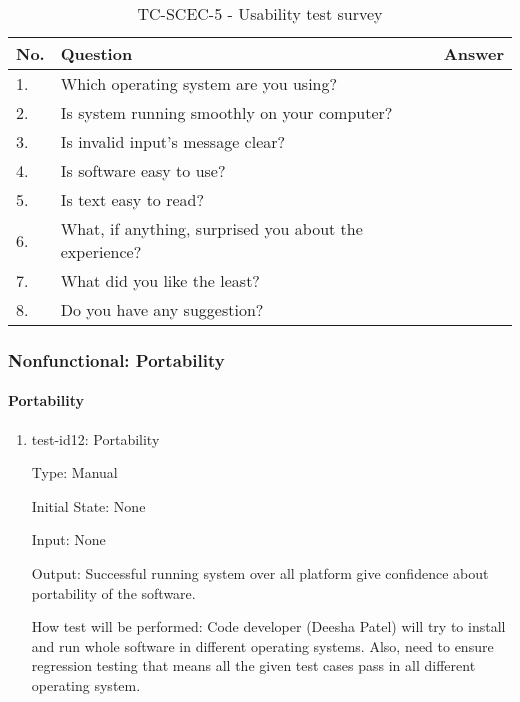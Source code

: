 \documentclass[12pt, titlepage]{article}
\begin{document}
\begin{table}[h!]
\begin{center}
\begin{tabular}{ p{0.5cm}|p{10cm}|c }
\hline
No. &  Question   & Answer \\
\hline
1. & Which operating system are you using?  & \\
2. & Is system running smoothly on your computer?  & \\
3. & Is invalid input's message clear?  &  \\
4. & Is software easy to use? & \\
5. & Is text easy to read? & \\
6. & What, if anything, surprised you about the experience? & \\
7. & What did you like the least? & \\
8. & Do you have any suggestion?  & \\

\hline
\end{tabular}
\caption{TC-SCEC-5 - Usability test survey}
\label{tab:tc-SCEC-5}
\end{center}
\end{table}

\subsubsection{Nonfunctional: Portability}
\label{non_functional_portability}		
\paragraph{Portability}

\begin{enumerate}
					
\item{test-id12: Portability\\}

Type: Manual
					
Initial State: None 
					
Input: None 
					
Output: Successful running system over all platform give confidence about portability of the software. 
					
How test will be performed: Code developer (Deesha Patel) will try to install and run whole software in different operating systems. Also, need to ensure regression testing that means all the given test cases pass in all different operating system.  

\end{enumerate}
\end{document}
